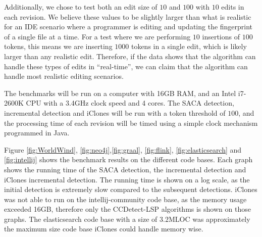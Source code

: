 Additionally, we chose to test both an edit size of $10$ and $100$ with $10$ edits in each
revision. We believe these values to be slightly larger than what is realistic for an IDE
scenario where a programmer is editing and updating the fingerprint of a single file at a
time. For a test where we are performing $10$ insertions of $100$ tokens, this means we
are inserting $1000$ tokens in a single edit, which is likely larger than any realistic
edit. Therefore, if the data shows that the algorithm can handle these types of edits in
``real-time'', we can claim that the algorithm can handle most realistic editing
scenarios.

The benchmarks will be run on a computer with 16GB RAM, and an Intel i7-2600K CPU with a
3.4GHz clock speed and 4 cores. The SACA detection, incremental detection and iClones will
be run with a token threshold of $100$, and the processing time of each revision will be
timed using a simple clock mechanism programmed in Java. 



Figure \ref{fig:WorldWind}, \ref{fig:neo4j},\ref{fig:graal}, \ref{fig:flink},
\ref{fig:elasticsearch} and \ref{fig:intellij} shows the benchmark results on the
different code bases. Each graph shows the running time of the SACA detection, the
incremental detection and iClones incremental detection. The running time is shown on a
log scale, as the initial detection is extremely slow compared to the subsequent
detections. iClones was not able to run on the intellij-community code base, as the memory
usage exceeded 16GB, therefore only the CCDetect-LSP algorithms is shown on those graphs.
The elasticsearch code base with a size of $3.2\text{MLOC}$ was approximately the maximum
size code base iClones could handle memory wise.


